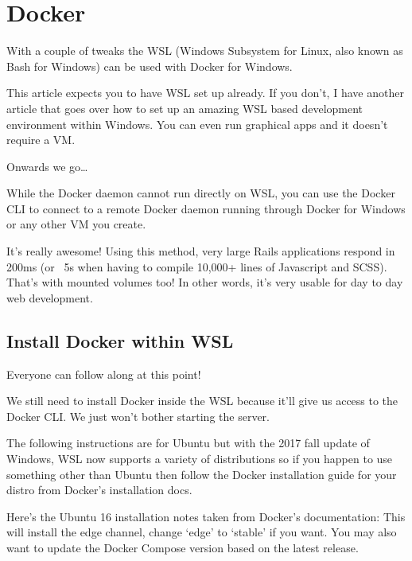 
\chapter{Docker}

With a couple of tweaks the WSL (Windows Subsystem for Linux, also known as Bash for Windows) can be used with Docker for Windows.

This article expects you to have WSL set up already. If you don’t, I have another article that goes over how to set up an amazing WSL based development environment within Windows. You can even run graphical apps and it doesn’t require a VM.

Onwards we go…

While the Docker daemon cannot run directly on WSL, you can use the Docker CLI to connect to a remote Docker daemon running through Docker for Windows or any other VM you create.

It’s really awesome! Using this method, very large Rails applications respond in 200ms (or ~5s when having to compile 10,000+ lines of Javascript and SCSS). That’s with mounted volumes too! In other words, it’s very usable for day to day web development.

\section{Install Docker within WSL}

Everyone can follow along at this point!

We still need to install Docker inside the WSL because it’ll give us access to the Docker CLI. We just won’t bother starting the server.

The following instructions are for Ubuntu but with the 2017 fall update of Windows, WSL now supports a variety of distributions so if you happen to use something other than Ubuntu then follow the Docker installation guide for your distro from Docker’s installation docs.

Here’s the Ubuntu 16 installation notes taken from Docker’s documentation:
This will install the edge channel, change ‘edge’ to ‘stable’ if you want. You may also want to update the Docker Compose version based on the latest release.

